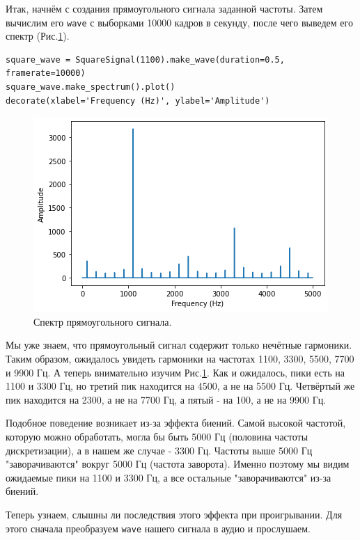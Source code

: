 \documentclass[a4paper, 14pt]{extarticle}
\begin{document}
    Итак, начнём с создания прямоугольного сигнала заданной частоты. Затем вычислим его \texttt{wave} с выборками 10000 кадров в секунду,
    после чего выведем его спектр (Рис.\ref{fig:task3_spectrum}).

    \begin{lstlisting}[caption= Создание сигнала и получение его \texttt{wave}., label={lst:task3_create_and_spectrum}]
square_wave = SquareSignal(1100).make_wave(duration=0.5, framerate=10000)
square_wave.make_spectrum().plot()
decorate(xlabel='Frequency (Hz)', ylabel='Amplitude')
    \end{lstlisting}

    \begin{figure}[H]
        \centering
        \includegraphics[width=0.8\linewidth]{resources/Images/task3_spectrum}
        \caption{Спектр прямоугольного сигнала.}
        \label{fig:task3_spectrum}
    \end{figure}

    Мы уже знаем, что прямоугольный сигнал содержит только нечётные гармоники.
    Таким образом, ожидалось увидеть гармоники на частотах 1100, 3300, 5500, 7700 и 9900 Гц.
    А теперь внимательно изучим Рис.\ref{fig:task3_spectrum}. Как и ожидалось, пики есть на 1100 и 3300 Гц, но третий пик
    находится на 4500, а не на 5500 Гц. Четвёртый же пик находится на 2300, а не на 7700 Гц, а пятый - на 100, а не на 9900 Гц.

    Подобное поведение возникает из-за эффекта биений.
    Самой высокой частотой, которую можно обработать, могла бы быть 5000 Гц (половина частоты дискретизации), а в нашем же случае - 3300 Гц.
    Частоты выше 5000 Гц "заворачиваются" вокруг 5000 Гц (частота заворота).
    Именно поэтому мы видим ожидаемые пики на 1100 и 3300 Гц, а все остальные "заворачиваются" из-за биений.

    Теперь узнаем, слышны ли последствия этого эффекта при проигрывании.
    Для этого сначала преобразуем \texttt{wave} нашего сигнала в аудио и прослушаем.
\end{document}
